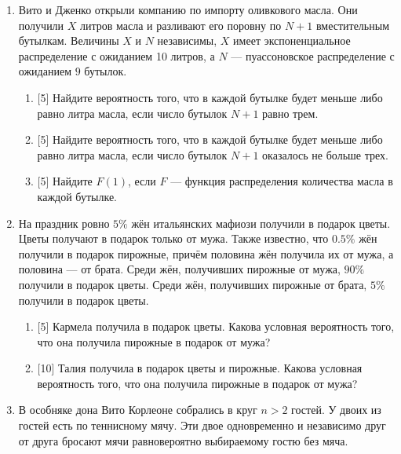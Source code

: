   
  \begin{enumerate}
  \item Вито и Дженко открыли компанию по импорту оливкового масла. 
  Они получили $X$ литров масла и разливают его поровну по $N+1$ вместительным бутылкам. 
  Величины $X$ и $N$ независимы, $X$ имеет экспоненциальное распределение с ожиданием 10 литров,
  а $N$ — пуассоновское распределение с ожиданием $9$ бутылок. 
  
  \begin{enumerate}
      \item {[5]} Найдите вероятность того, что в каждой бутылке будет меньше либо равно литра масла,
      если число бутылок $N + 1$ равно трем.
      \item {[5]} Найдите вероятность того, что в каждой бутылке будет меньше либо равно литра масла, 
      если число бутылок $N + 1$ оказалось не больше трех. 
      \item {[5]} Найдите $F(1)$, если $F$ — функция распределения количества масла в каждой бутылке.
  \end{enumerate}
  
  
  \item На праздник ровно $5\%$ жён итальянских мафиози получили в подарок цветы. 
  Цветы получают в подарок только от мужа. 
  Также известно, что $0.5\%$ жён получили в подарок пирожные,
  причём половина жён получила их от мужа, а половина — от брата.
  Среди жён, получивших пирожные от мужа, $90\%$ получили в подарок цветы. 
  Среди жён, получивших пирожные от брата, $5\%$ получили в подарок цветы.
  
  \begin{enumerate}
      \item {[5]} Кармела получила в подарок цветы. 
      Какова условная вероятность того, что она получила пирожные в подарок от мужа?
      \item {[10]} Талия получила в подарок цветы и пирожные. 
      Какова условная вероятность того, что она получила пирожные в подарок от мужа?
  \end{enumerate}
  
  
  \item В особняке дона Вито Корлеоне собрались в круг $n>2$ гостей. 
  У двоих из гостей есть по теннисному мячу. 
  Эти двое одновременно и независимо друг от друга бросают мячи равновероятно выбираемому гостю 
  без мяча.  
  

\end{enumerate}

